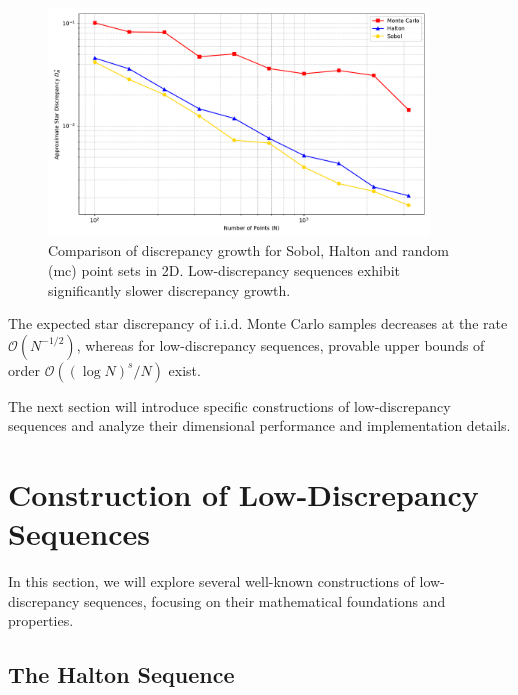 \begin{figure}[H]
\centering
\includegraphics[width=0.9\textwidth]{Figures/qmc_discrepancy_comparison.pdf}
\caption{Comparison of discrepancy growth for Sobol, Halton and random (\ac{mc})
point sets in 2D. Low-discrepancy sequences exhibit significantly slower
discrepancy growth.}
\label{fig:qmc-discrepancy-comparison}
\end{figure}

\begin{remark}
The expected star discrepancy of i.i.d. Monte Carlo samples decreases at the
rate $\mathcal{O}(N^{-1/2})$, whereas for low-discrepancy sequences, provable
upper bounds of order $\mathcal{O}((\log N)^s / N)$ exist.
\cite[Section~2.2]{leobacher2014introduction}
\end{remark}

The next section will introduce specific constructions of low-discrepancy
sequences and analyze their dimensional performance and implementation details.


\section{Construction of Low-Discrepancy Sequences}
In this section, we will explore several well-known constructions of
low-discrepancy sequences, focusing on their mathematical foundations and
properties.


\subsection{The Halton Sequence}
\label{subsec:halton-sequence}

